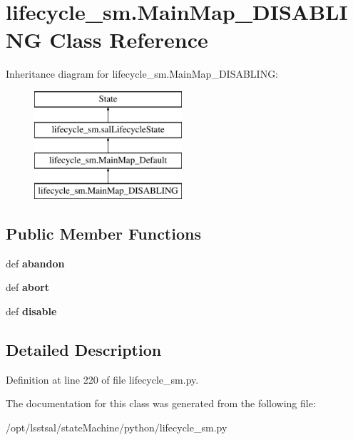 \hypertarget{classlifecycle__sm_1_1_main_map___d_i_s_a_b_l_i_n_g}{\section{lifecycle\-\_\-sm.\-Main\-Map\-\_\-\-D\-I\-S\-A\-B\-L\-I\-N\-G Class Reference}
\label{classlifecycle__sm_1_1_main_map___d_i_s_a_b_l_i_n_g}
}
Inheritance diagram for lifecycle\-\_\-sm.\-Main\-Map\-\_\-\-D\-I\-S\-A\-B\-L\-I\-N\-G\-:\begin{figure}[H]
\begin{center}
\leavevmode
\includegraphics[height=4.000000cm]{classlifecycle__sm_1_1_main_map___d_i_s_a_b_l_i_n_g}
\end{center}
\end{figure}
\subsection*{Public Member Functions}
\begin{DoxyCompactItemize}
\item 
\hypertarget{classlifecycle__sm_1_1_main_map___d_i_s_a_b_l_i_n_g_a28dc7136724bb6825dc0d70c6efa0e3b}{def {\bfseries abandon}}\label{classlifecycle__sm_1_1_main_map___d_i_s_a_b_l_i_n_g_a28dc7136724bb6825dc0d70c6efa0e3b}

\item 
\hypertarget{classlifecycle__sm_1_1_main_map___d_i_s_a_b_l_i_n_g_a46ae1fd9cd727bb7558e7b7d6f96f443}{def {\bfseries abort}}\label{classlifecycle__sm_1_1_main_map___d_i_s_a_b_l_i_n_g_a46ae1fd9cd727bb7558e7b7d6f96f443}

\item 
\hypertarget{classlifecycle__sm_1_1_main_map___d_i_s_a_b_l_i_n_g_a9a5d4616f1d05c1444086dd4789e5e89}{def {\bfseries disable}}\label{classlifecycle__sm_1_1_main_map___d_i_s_a_b_l_i_n_g_a9a5d4616f1d05c1444086dd4789e5e89}

\end{DoxyCompactItemize}


\subsection{Detailed Description}


Definition at line 220 of file lifecycle\-\_\-sm.\-py.



The documentation for this class was generated from the following file\-:\begin{DoxyCompactItemize}
\item 
/opt/lsstsal/state\-Machine/python/lifecycle\-\_\-sm.\-py\end{DoxyCompactItemize}
